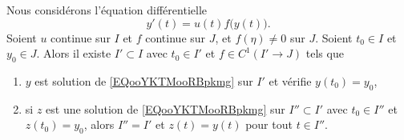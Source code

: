 \begin{proposition} \label{PropOkmXmC}
	Nous considérons l'équation différentielle
	\begin{equation}		\label{EQooYKTMooRBpkmg}
		y'(t)=u(t)f\big( y(t) \big).
	\end{equation}
	Soient \( u\) continue sur \( I\) et \( f\) continue sur \( J\), et \( f(\eta)\neq 0\) sur \( J\). Soient \( t_0\in I\) et \( y_0\in J\). Alors il existe \( I'\subset I\) avec \( t_0\in I'\) et \( f\in C^1(I'\to J)\) tels que
	\begin{enumerate}

		\item
		      \( y\) est solution de \eqref{EQooYKTMooRBpkmg} sur \( I'\) et vérifie \( y(t_0)=y_0\),
		\item
		      si \( z\) est une solution de \eqref{EQooYKTMooRBpkmg} sur \( I''\subset I'\) avec \( t_0\in I''\) et \( z(t_0)=y_0\), alors \( I''= I'\) et \( z(t)=y(t)\) pour tout \( t\in I''\).
	\end{enumerate}
\end{proposition}

